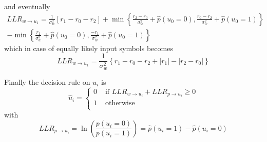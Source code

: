 \documentclass[10pt]{article}
\begin{document}
and eventually
\begin{multline}
LLR_{w \rightarrow u_1} = 
		\frac{1}{\sigma_w^2}\left[r_1 - r_0 - r_2 \right] + \min\left\{ \frac{r_2-r_0}{\sigma_w^2} + \hat{p}(u_0=0), \frac{r_0-r_2}{\sigma_w^2} + \hat{p}(u_0=1) \right\} \\ -
		\min\left\{ \frac{r_1}{\sigma_w^2} + \hat{p}(u_0=0), \frac{-r_1}{\sigma_w^2} + \hat{p}(u_0=1) \right\}
\end{multline}
which in case of equally likely input symbols becomes
\begin{equation}\label{eq:llrmin1}
	LLR_{w \rightarrow u_1} = \frac{1}{\sigma_w^2}\left\{ r_1 - r_0 - r_2 + |r_1| - |r_2 - r_0| \right\}
\end{equation}

Finally the decision rule on $u_i$ is
\begin{equation}
\hat{u}_i = \begin{cases}
				0 & \mbox{ if } LLR_{w\rightarrow u_i} + LLR_{p\rightarrow u_i} \ge 0 \\
				1 & \mbox{ otherwise } \\
			\end{cases}
\end{equation}
with
\begin{equation}
LLR_{p\rightarrow u_i} = \ln \left( \frac{p(u_i = 0)}{p(u_i=1)} \right) = \hat{p}(u_i = 1) - \hat{p}(u_i = 0)
\end{equation}
\end{document}
